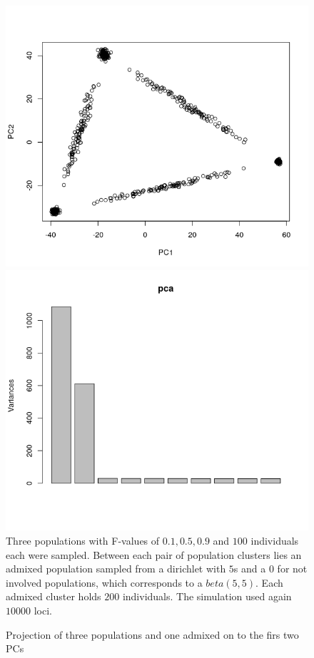 \documentclass[a4paper, 11pt]{article}
\begin{document}
\begin{figure}[h!]
\caption{Projection of three populations and one admixed on to the firs two PCs}
\includegraphics[scale=0.5]{Rplot_admixed_simplex}
\includegraphics[scale=0.5]{Rplot_eigenvalues_simplex}
Three populations with F-values  of $0.1, 0.5, 0.9$ and $100$ individuals each were sampled. Between each pair of population clusters lies an admixed population sampled from a dirichlet with $5$s and a $0$ for not involved populations, which corresponds to a $beta(5, 5)$. Each admixed cluster holds $200$ individuals. The simulation used again $10000$ loci.

\centering
\end{figure}
\end{document}
